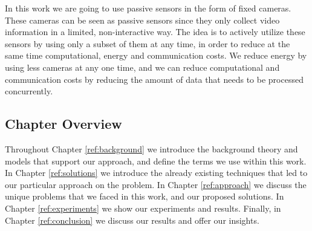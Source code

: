 In this work we are going to use passive sensors in the form of fixed cameras. These cameras can be
seen as passive sensors since they only collect video information in a limited, non-interactive way.
The idea is to actively utilize these sensors by using only a subset of them at any time, in order
to reduce at the same time computational, energy and communication costs. We reduce energy by using
less cameras at any one time, and we can reduce computational and communication costs by reducing
the amount of data that needs to be processed concurrently.





\subsection{Chapter Overview}
Throughout Chapter \ref{ref:background} we introduce the background theory and models that support
our approach, and define the terms we use within this work. In Chapter \ref{ref:solutions} we
introduce the already existing techniques that led to our particular approach on the problem. In
Chapter \ref{ref:approach} we discuss the unique problems that we faced in this work, and our
proposed solutions. In Chapter \ref{ref:experiments} we show our experiments and results. Finally,
in Chapter \ref{ref:conclusion} we discuss our results and offer our insights.

